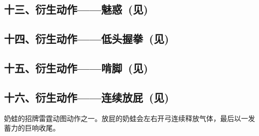

\subsection[十三、衍生动作——魅惑]{十三、衍生动作——魅惑~(见)}



\clearpage
\subsection[十四、衍生动作——低头握拳]{十四、衍生动作——低头握拳~(见)}



\subsection[十五、衍生动作——啃脚]{十五、衍生动作——啃脚~(见)}



\subsection[十六、衍生动作——连续放屁]{十六、衍生动作——连续放屁~(见)}



奶蛙的招牌雷霆动图动作之一。放屁的奶蛙会左右开弓连续释放气体，最后以一发蓄力的巨响收尾。
